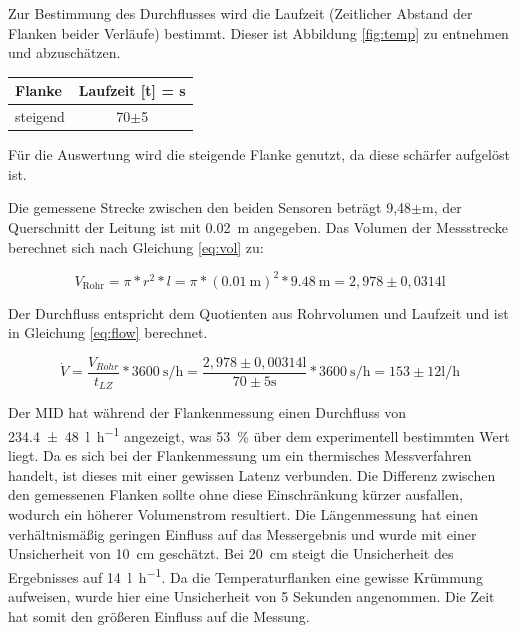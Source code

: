 Zur Bestimmung des Durchflusses wird  die Laufzeit (Zeitlicher Abstand der Flanken beider Verläufe) bestimmt. Dieser ist Abbildung \ref{fig:temp} zu entnehmen und abzuschätzen.

\begin{center}
	\begin{tabular}{l|c}
		\label{tab:}
		
		\textbf{Flanke} & \textbf{Laufzeit} [t] = s\\
		\hline
		steigend & 70$\pm$5 
	\end{tabular}
\end{center}

Für die Auswertung wird die steigende Flanke genutzt, da diese schärfer aufgelöst ist.

Die gemessene Strecke zwischen den beiden Sensoren beträgt 9,48$\pm$\si{\meter}, der Querschnitt der Leitung ist mit \SI{0,02}{\meter} angegeben. Das Volumen der Messstrecke berechnet sich nach Gleichung \ref{eq:vol} zu:

\begin{equation}
	\label{eq:vol}
	V_{\text{Rohr}} = \pi * r^2 * l = \pi * (\SI{0,01}{\meter})^2 * \SI{9,48}{\meter} = 2,978\pm0,0314\si{\litre}
\end{equation}

Der Durchfluss entspricht dem Quotienten aus Rohrvolumen und Laufzeit und ist in Gleichung \ref{eq:flow} berechnet.

\begin{equation}
	\label{eq:flow}
	\dot V = \frac{V_{Rohr}}{t_{LZ}}*\SI{3600}{\second\per\hour} = \frac{2,978\pm0,00314\si{\litre}}{70\pm5\si{\second}}*\SI{3600}{\second\per\hour} = 153\pm12\si{\litre\per\hour}
\end{equation}

Der MID hat während der Flankenmessung einen Durchfluss von \SI{234,4(48)}{\litre\per\hour} angezeigt, was \SI{53}{\percent} über dem experimentell bestimmten Wert liegt. Da es sich bei der Flankenmessung um ein thermisches Messverfahren handelt, ist dieses mit einer gewissen Latenz verbunden. Die Differenz zwischen den gemessenen Flanken sollte ohne diese Einschränkung kürzer ausfallen, wodurch ein höherer Volumenstrom resultiert. Die Längenmessung hat einen verhältnismäßig geringen Einfluss auf das Messergebnis und wurde mit einer Unsicherheit von \SI{10}{\centi\meter} geschätzt. Bei \SI{20}{\centi\meter} steigt die Unsicherheit des Ergebnisses auf \SI{14}{\litre\per\hour}. Da die Temperaturflanken eine gewisse Krümmung aufweisen, wurde hier eine Unsicherheit von 5 Sekunden angenommen. Die Zeit hat somit den größeren Einfluss auf die Messung. 


